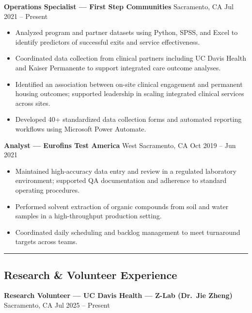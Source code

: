 \documentclass[11pt]{article}
\begin{document}
\textbf{Operations Specialist --- First Step Communities} \textbar{}
Sacramento, CA \textbar{} Jul 2021 -- Present

\begin{itemize}
\tightlist
\item
  Analyzed program and partner datasets using Python, SPSS, and Excel to
  identify predictors of successful exits and service effectiveness.
\item
  Coordinated data collection from clinical partners including UC Davis
  Health and Kaiser Permanente to support integrated care outcome
  analyses.
\item
  Identified an association between on-site clinical engagement and
  permanent housing outcomes; supported leadership in scaling integrated
  clinical services across sites.
\item
  Developed 40+ standardized data collection forms and automated
  reporting workflows using Microsoft Power Automate.
\end{itemize}

\textbf{Analyst --- Eurofins Test America} \textbar{} West Sacramento,
CA \textbar{} Oct 2019 -- Jun 2021

\begin{itemize}
\tightlist
\item
  Maintained high-accuracy data entry and review in a regulated
  laboratory environment; supported QA documentation and adherence to
  standard operating procedures.
\item
  Performed solvent extraction of organic compounds from soil and water
  samples in a high-throughput production setting.
\item
  Coordinated daily scheduling and backlog management to meet turnaround
  targets across teams.
\end{itemize}

\begin{center}\rule{0.5\linewidth}{0.5pt}\end{center}

\subsection{Research \& Volunteer
Experience}\label{research-volunteer-experience}

\textbf{Research Volunteer --- UC Davis Health --- Z-Lab (Dr.~Jie
Zheng)} \textbar{} Sacramento, CA \textbar{} Jul 2025 -- Present
\end{document}
